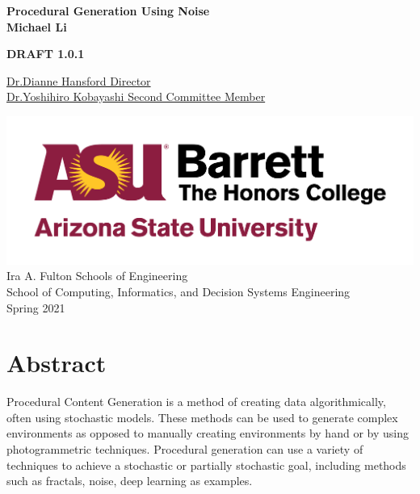 \documentclass[12pt]{report}
\begin{document}
	\begin{titlepage}
		\begin{center}
			\Large
			\textbf{Procedural Generation Using Noise}\\
			
			\vspace{1.5cm}
			\normalsize
			\textbf{Michael Li}\\
			
			\vfill
			
			\textbf{DRAFT 1.0.1}
			
			\uline{Dr.Dianne Hansford \hfill Director}\\
			\vspace{1.5cm}
			\uline{Dr.Yoshihiro Kobayashi \hfill Second Committee Member}\\
			
			\vspace{3cm}
			
			\includegraphics[scale=.5]{asu_barretthonors_horiz_rgb_maroongold_600ppi}\\
			\vspace{1.5cm}
			Ira A. Fulton Schools of Engineering \\
			School of Computing, Informatics, and Decision Systems Engineering\\
			Spring 2021
		\end{center}
	\end{titlepage}
	
	\chapter*{Abstract}
	
	Procedural Content Generation is a method of creating data algorithmically, often using stochastic models. These methods can be used to generate complex environments as opposed to manually creating environments by hand or by using photogrammetric techniques. Procedural generation can use a variety of techniques to achieve a stochastic or partially stochastic goal, including methods such as fractals,  noise, deep learning as examples. \\
	\clearpage
	
\end{document}
